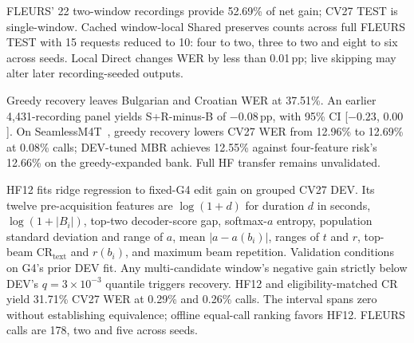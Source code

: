 FLEURS' 22 two-window recordings provide 52.69\% of net gain; CV27 TEST is single-window. Cached window-local Shared preserves counts across full FLEURS TEST with 15 requests reduced to 10: four to two, three to two and eight to six across seeds. Local Direct changes WER by less than 0.01\,pp; live skipping may alter later recording-seeded outputs.

Greedy recovery leaves Bulgarian and Croatian WER at 37.51\%. An earlier 4,431-recording panel yields S+R-minus-B of $-0.08$\,pp, with 95\% CI [$-0.23$, $0.00$]. On SeamlessM4T~\cite{seamless2023,seamlessv1nature}, greedy recovery lowers CV27 WER from 12.96\% to 12.69\% at 0.08\% calls; DEV-tuned MBR achieves 12.55\% against four-feature risk's 12.66\% on the greedy-expanded bank. Full HF transfer remains unvalidated.

HF12 fits ridge regression to fixed-G4 edit gain on grouped CV27 DEV. Its twelve pre-acquisition features are $\log(1+d)$ for duration $d$ in seconds, $\log(1+|B_i|)$, top-two decoder-score gap, softmax-$a$ entropy, population standard deviation and range of $a$, mean $|a-a(b_i)|$, ranges of $t$ and $r$, top-beam $\mathrm{CR}_{\mathrm{text}}$ and $r(b_i)$, and maximum beam repetition. Validation conditions on G4's prior DEV fit. Any multi-candidate window's negative gain strictly below DEV's $q=3\times10^{-3}$ quantile triggers recovery. HF12 and eligibility-matched CR yield 31.71\% CV27 WER at 0.29\% and 0.26\% calls. The interval spans zero without establishing equivalence; offline equal-call ranking favors HF12. FLEURS calls are 178, two and five across seeds.
